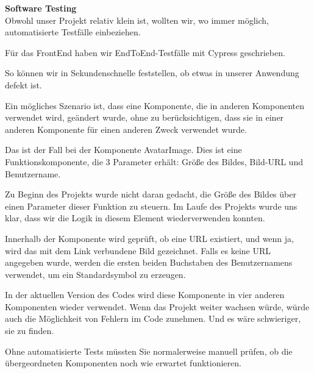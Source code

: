 \textbf{Software Testing }\\
Obwohl unser Projekt relativ klein ist, wollten wir, wo immer möglich, automatisierte Testfälle einbeziehen.

Für das FrontEnd haben wir EndToEnd-Testfälle mit Cypress geschrieben.

So können wir in Sekundenschnelle feststellen, ob etwas in unserer Anwendung defekt ist.

Ein mögliches Szenario ist, dass eine Komponente, die in anderen Komponenten verwendet wird, geändert wurde, ohne zu berücksichtigen, dass sie in einer anderen Komponente für einen anderen Zweck verwendet wurde.

Das ist der Fall bei der Komponente AvatarImage.
Dies ist eine Funktionskomponente, die 3 Parameter erhält: Größe des Bildes, Bild-URL und Benutzername.

Zu Beginn des Projekts wurde nicht daran gedacht, die Größe des Bildes über einen Parameter dieser Funktion zu steuern. Im Laufe des Projekts wurde uns klar, dass wir die Logik in diesem Element wiederverwenden konnten.

Innerhalb der Komponente wird geprüft, ob eine URL existiert, und wenn ja, wird das mit dem Link verbundene Bild gezeichnet. Falls es keine URL  angegeben wurde, werden die ersten beiden Buchstaben des Benutzernamens verwendet, um ein Standardsymbol zu erzeugen.

In der aktuellen Version des Codes wird diese Komponente in vier anderen Komponenten wieder verwendet.
Wenn das Projekt weiter wachsen würde, würde auch die Möglichkeit von Fehlern im Code zunehmen. Und es wäre schwieriger, sie zu finden.

Ohne automatisierte Tests müssten Sie normalerweise manuell prüfen, ob die übergeordneten Komponenten noch wie erwartet funktionieren.


